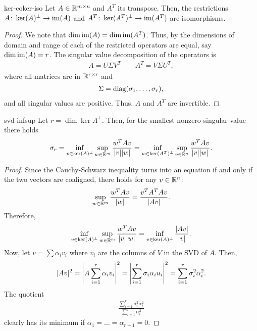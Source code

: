 \begin{Corollary}{ker-coker-iso}
  Let $A\in \R^{m\times n}$ and $A^T$ its transpose. Then, the
  restrictions $A\colon \ker A^\perp \to \range A$ and $A^T\colon
  \ker{A^T}^\perp \to \range{A^T}$ are isomorphisms.
\end{Corollary}

\begin{proof}
  We note that $\dim \range A = \dim \range{A^T}$. Thus, by
   the dimensions of domain and range of
  each of the restricted operators are equal, say $\dim \range A =
  r$. The singular value decomposition of the operators is
  \begin{gather*}
    A = U\Sigma V^T \qquad A^T = V\Sigma U^T,
  \end{gather*}
  where all matrices are in $\R^{r\times r}$ and
  \begin{gather*}
    \Sigma = \diag(\sigma_1,\dots,\sigma_r),
  \end{gather*}
  and all singular values are positive. Thus, $A$ and $A^T$ are invertible.
\end{proof}

\begin{Corollary}{svd-infsup}
  Let $r=\dim \ker A^\perp$. Then, for the smallest nonzero singular
  value there holds
  \begin{gather}
    \label{eq:infsup:6}
    \sigma_r
    = \inf_{v\in \ker{A}^\perp} \sup_{w\in \R^m} \frac{w^T A v}{\abs{v}\abs{w}}
    = \inf_{w\in \ker{A^T}^\perp} \sup_{v\in \R^n} \frac{w^T A v}{\abs{v}\abs{w}}.
  \end{gather}
\end{Corollary}

\begin{proof}
  Since the Cauchy-Schwarz inequality turns into an equation if and
  only if the two vectors are coaligned, there holds for any $v\in \R^n$:
  \begin{gather*}
    \sup_{w\in\R^m}\frac{w^T A v}{\abs{w}} = \frac{v^T A^T A v}{\abs{Av}}.
  \end{gather*}
  Therefore,
  \begin{gather*}
    \inf_{v\in \ker{A}^\perp} \sup_{w\in \R^m}
    \frac{w^T A v}{\abs{v}\abs{w}}
    = \inf_{v\in \ker{A}^\perp} \frac{\abs{Av}}{\abs{v}}.
  \end{gather*}
  Now, let $v = \sum \alpha_i v_i$ where $v_i$ are the columns of $V$
  in the SVD of $A$. Then,
  \begin{gather*}
    \abs{Av}^2 = \abs*{A\sum_{i=1}^r \alpha_i v_i}^2
    = \abs*{\sum_{i=1}^r \sigma_i \alpha_i u_i}^2
    = \sum_{i=1}^r \sigma_i^2 \alpha_i^2.
  \end{gather*}
  The quotient
  \begin{gather*}
    \frac{\sum_{i=1}^r \sigma_i^2 \alpha_i^2}{\sum_{i=1}^r \alpha_i^2}
  \end{gather*}
  clearly has its minimum if $\alpha_1 = \dots=\alpha_{r-1} = 0$.
\end{proof}


